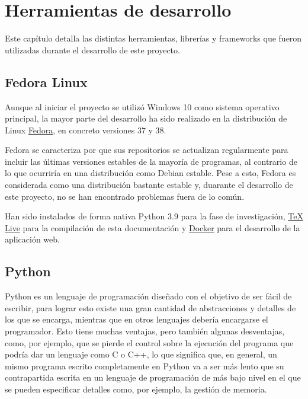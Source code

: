 \label{cha:Técnicas y herraminetas}

\section{Herramientas de desarrollo}

Este capítulo detalla las distintas herramientas, librerías y frameworks que
fueron utilizadas durante el desarrollo de este proyecto.

\subsection{Fedora Linux}

Aunque al iniciar el proyecto se utilizó Windows 10 como sistema operativo
principal, la mayor parte del desarrollo ha sido realizado en la distribución de
Linux \href{https://fedoraproject.org/}{Fedora}, en concreto versiones 37 y 38.

Fedora se caracteriza por que sus repositorios se actualizan regularmente para
incluir las últimas versiones estables de la mayoría de programas, al contrario
de lo que ocurriría en una distribución como Debian estable. Pese a esto, Fedora
es considerada como una distribución bastante estable y, duarante el desarrollo
de este proyecto, no se han encontrado problemas fuera de lo común.

Han sido instalados de forma nativa Python 3.9 para la fase de investigación,
\href{https://www.tug.org/texlive/}{\TeX{} Live} para la compilación de esta
documentación y \href{https://www.docker.com/}{Docker} para el desarrollo de la
aplicación web.

\subsection{Python}

Python es un lenguaje de programación diseñado con el objetivo de ser fácil de
escribir, para lograr esto existe una gran cantidad de abstracciones y detalles
de los que se encarga, mientras que en otros lenguajes debería encargarse el
programador. Esto tiene muchas ventajas, pero también algunas desventajas, como,
por ejemplo, que se pierde el control sobre la ejecución del programa que podría
dar un lenguaje como C o C++, lo que significa que, en general, un mismo
programa escrito completamente en Python va a ser más lento que su contrapartida
escrita en un lenguaje de programación de más bajo nivel en el que se pueden
especificar detalles como, por ejemplo, la gestión de memoria.

